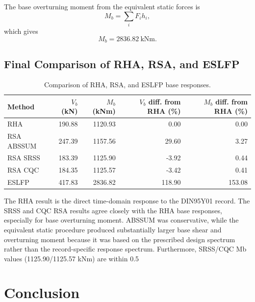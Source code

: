 \documentclass[11pt,a4paper]{article}
\begin{document}
The base overturning moment from the equivalent static forces is
\begin{equation}
M_b=\sum_iF_ih_i,
\end{equation}
which gives
\begin{equation}
\boxed{M_b=2836.82\ \mathrm{kNm}}.
\end{equation}

\subsection{Final Comparison of RHA, RSA, and ESLFP}

\begin{table}[H]
\centering
\caption{Comparison of RHA, RSA, and ESLFP base responses.}
\begin{tabular}{lrrrr}
\toprule
Method & $V_b$ (kN) & $M_b$ (kNm) & $V_b$ diff. from RHA (\%) & $M_b$ diff. from RHA (\%)\\
\midrule
RHA & 190.88 & 1120.93 & 0.00 & 0.00\\
RSA ABSSUM & 247.39 & 1157.56 & 29.60 & 3.27\\
RSA SRSS & 183.39 & 1125.90 & -3.92 & 0.44\\
RSA CQC & 184.35 & 1125.57 & -3.42 & 0.41\\
ESLFP & 417.83 & 2836.82 & 118.90 & 153.08\\
\bottomrule
\end{tabular}
\label{tab:q4e_final_comparison}
\end{table}

The RHA result is the direct time-domain response to the DIN95Y01 record. The SRSS and CQC RSA results agree closely with the RHA base responses, especially for base overturning moment. ABSSUM was conservative, while the equivalent static procedure produced substantially larger base shear and overturning moment because it was based on the prescribed design spectrum rather than the record-specific response spectrum. Furthermore, SRSS/CQC Mb values (1125.90/1125.57 kNm) are within 0.5%
\pagebreak
\section{Conclusion}
\end{document}
